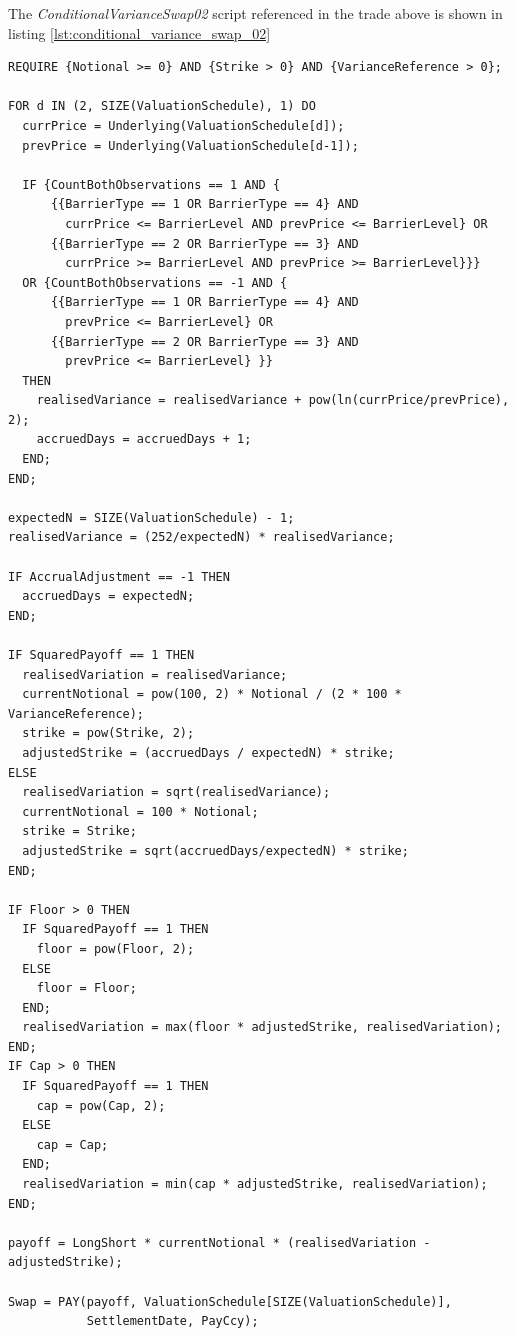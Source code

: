 The \emph{ConditionalVarianceSwap02} script referenced in the trade above is shown in listing
\ref{lst:conditional_variance_swap_02}

\begin{listing}[hbt]
\begin{verbatim}
REQUIRE {Notional >= 0} AND {Strike > 0} AND {VarianceReference > 0};

FOR d IN (2, SIZE(ValuationSchedule), 1) DO
  currPrice = Underlying(ValuationSchedule[d]);
  prevPrice = Underlying(ValuationSchedule[d-1]);

  IF {CountBothObservations == 1 AND {
      {{BarrierType == 1 OR BarrierType == 4} AND
        currPrice <= BarrierLevel AND prevPrice <= BarrierLevel} OR
      {{BarrierType == 2 OR BarrierType == 3} AND
        currPrice >= BarrierLevel AND prevPrice >= BarrierLevel}}}
  OR {CountBothObservations == -1 AND {
      {{BarrierType == 1 OR BarrierType == 4} AND
        prevPrice <= BarrierLevel} OR
      {{BarrierType == 2 OR BarrierType == 3} AND
        prevPrice <= BarrierLevel} }}
  THEN
    realisedVariance = realisedVariance + pow(ln(currPrice/prevPrice), 2);
    accruedDays = accruedDays + 1;
  END;
END;

expectedN = SIZE(ValuationSchedule) - 1;
realisedVariance = (252/expectedN) * realisedVariance;

IF AccrualAdjustment == -1 THEN
  accruedDays = expectedN;
END;

IF SquaredPayoff == 1 THEN
  realisedVariation = realisedVariance;
  currentNotional = pow(100, 2) * Notional / (2 * 100 * VarianceReference);
  strike = pow(Strike, 2);
  adjustedStrike = (accruedDays / expectedN) * strike;
ELSE
  realisedVariation = sqrt(realisedVariance);
  currentNotional = 100 * Notional;
  strike = Strike;
  adjustedStrike = sqrt(accruedDays/expectedN) * strike;
END;

IF Floor > 0 THEN
  IF SquaredPayoff == 1 THEN
    floor = pow(Floor, 2);
  ELSE
    floor = Floor;
  END;
  realisedVariation = max(floor * adjustedStrike, realisedVariation);
END;
IF Cap > 0 THEN
  IF SquaredPayoff == 1 THEN
    cap = pow(Cap, 2);
  ELSE
    cap = Cap;
  END;
  realisedVariation = min(cap * adjustedStrike, realisedVariation);
END;

payoff = LongShort * currentNotional * (realisedVariation - adjustedStrike);

Swap = PAY(payoff, ValuationSchedule[SIZE(ValuationSchedule)],
           SettlementDate, PayCcy);
\end{verbatim}
\caption{Payoff script for a ConditionalVarianceSwap02.}
\label{lst:conditional_variance_swap_02}
\end{listing}

